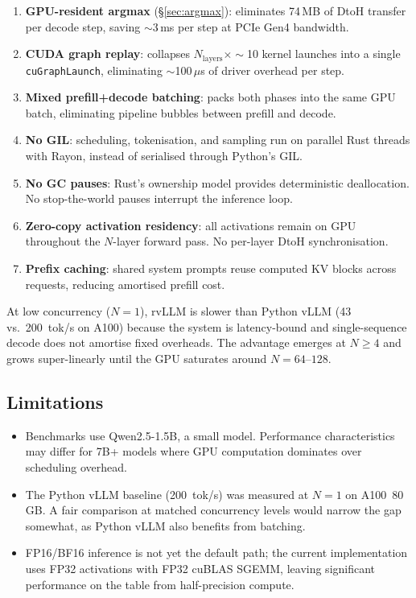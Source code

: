 \documentclass[11pt,a4paper]{article}
\begin{document}
\begin{enumerate}
  \item \textbf{GPU-resident argmax} (\S\ref{sec:argmax}): eliminates 74\,MB of
        DtoH transfer per decode step, saving $\sim$3\,ms per step at PCIe Gen4
        bandwidth.
  \item \textbf{CUDA graph replay}: collapses $N_{\text{layers}} \times \sim$10
        kernel launches into a single \texttt{cuGraphLaunch}, eliminating
        $\sim$100\,$\mu$s of driver overhead per step.
  \item \textbf{Mixed prefill+decode batching}: packs both phases into the same GPU
        batch, eliminating pipeline bubbles between prefill and decode.
  \item \textbf{No GIL}: scheduling, tokenisation, and sampling run on parallel Rust
        threads with Rayon, instead of serialised through Python's GIL.
  \item \textbf{No GC pauses}: Rust's ownership model provides deterministic
        deallocation. No stop-the-world pauses interrupt the inference loop.
  \item \textbf{Zero-copy activation residency}: all activations remain on GPU
        throughout the $N$-layer forward pass. No per-layer DtoH synchronisation.
  \item \textbf{Prefix caching}: shared system prompts reuse computed KV blocks
        across requests, reducing amortised prefill cost.
\end{enumerate}

At low concurrency ($N\!=\!1$), rvLLM is slower than Python vLLM (43 vs.\ 200~tok/s
on A100) because the system is latency-bound and single-sequence decode does not
amortise fixed overheads. The advantage emerges at $N \geq 4$ and grows
super-linearly until the GPU saturates around $N\!=\!64$--$128$.

\subsection{Limitations}

\begin{itemize}
  \item Benchmarks use Qwen2.5-1.5B, a small model. Performance characteristics
        may differ for 7B+ models where GPU computation dominates over scheduling
        overhead.
  \item The Python vLLM baseline (200~tok/s) was measured at $N\!=\!1$ on A100~80\,GB.
        A fair comparison at matched concurrency levels would narrow the gap somewhat,
        as Python vLLM also benefits from batching.
  \item FP16/BF16 inference is not yet the default path; the current implementation
        uses FP32 activations with FP32 cuBLAS SGEMM, leaving significant performance
        on the table from half-precision compute.
\end{itemize}
\end{document}
